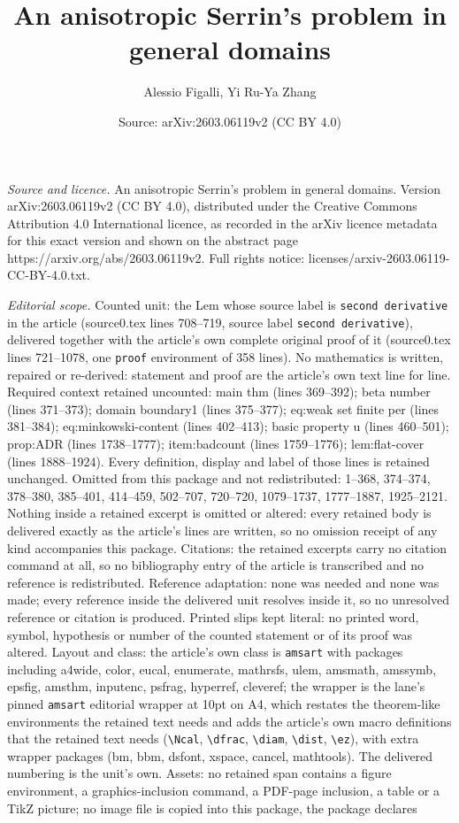 \documentclass[10pt,a4paper]{amsart}
\title[An anisotropic Serrin's problem in general domains]{An anisotropic Serrin's problem in general domains}
\author{Alessio Figalli, Yi Ru-Ya Zhang}
\date{Source: arXiv:2603.06119v2 (CC BY 4.0)}
\begin{document}
\maketitle

\noindent\emph{Source and licence.} An anisotropic Serrin's problem in general domains. Version arXiv:2603.06119v2 (CC BY 4.0), distributed under the Creative Commons Attribution 4.0 International licence, as recorded in the arXiv licence metadata for this exact version and shown on the abstract page https://arxiv.org/abs/2603.06119v2. Full rights notice: licenses/arxiv-2603.06119-CC-BY-4.0.txt.\par\smallskip

\noindent\textit{Editorial scope.} Counted unit: the Lem whose source label is \texttt{second derivative} in the article (source0.tex lines 708--719, source label \texttt{second derivative}), delivered together with the article's own complete original proof of it (source0.tex lines 721--1078, one \texttt{proof} environment of 358 lines). No mathematics is written, repaired or re-derived: statement and proof are the article's own text line for line. Required context retained uncounted: main thm (lines 369--392); beta number (lines 371--373); domain boundary1 (lines 375--377); eq:weak set finite per (lines 381--384); eq:minkowski-content (lines 402--413); basic property u (lines 460--501); prop:ADR (lines 1738--1777); item:badcount (lines 1759--1776); lem:flat-cover (lines 1888--1924). Every definition, display and label of those lines is retained unchanged. Omitted from this package and not redistributed: 1--368, 374--374, 378--380, 385--401, 414--459, 502--707, 720--720, 1079--1737, 1777--1887, 1925--2121. Nothing inside a retained excerpt is omitted or altered: every retained body is delivered exactly as the article's lines are written, so no omission receipt of any kind accompanies this package. Citations: the retained excerpts carry no citation command at all, so no bibliography entry of the article is transcribed and no reference is redistributed. Reference adaptation: none was needed and none was made; every reference inside the delivered unit resolves inside it, so no unresolved reference or citation is produced. Printed slips kept literal: no printed word, symbol, hypothesis or number of the counted statement or of its proof was altered. Layout and class: the article's own class is \texttt{amsart} with packages including a4wide, color, eucal, enumerate, mathrsfs, ulem, amsmath, amssymb, epsfig, amsthm, inputenc, psfrag, hyperref, cleveref; the wrapper is the lane's pinned \texttt{amsart} editorial wrapper at 10pt on A4, which restates the theorem-like environments the retained text needs and adds the article's own macro definitions that the retained text needs (\texttt{\textbackslash Ncal}, \texttt{\textbackslash dfrac}, \texttt{\textbackslash diam}, \texttt{\textbackslash dist}, \texttt{\textbackslash ez}), with extra wrapper packages (bm, bbm, dsfont, xspace, cancel, mathtools). The delivered numbering is the unit's own. Assets: no retained span contains a figure environment, a graphics-inclusion command, a PDF-page inclusion, a table or a TikZ picture; no image file is copied into this package, the package declares 
\end{document}
